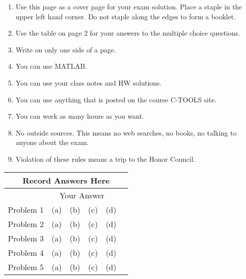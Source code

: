 \documentclass[letterpaper]{article}
\begin{document}
\vspace*{.45in} 
\begin{enumerate}
\item Use this page as a cover page for your exam solution. Place a staple in the upper left hand corner. Do not staple along the edges to form a booklet.
    \item Use the table on page 2 for your answers to the multiple choice questions.
    \item Write on only one side of a page.
\item You can use MATLAB.
\item You can use your class notes and HW solutions.
 \item You can use anything that is posted on the course C-TOOLS site.
 \item You can work as many hours as you want.
 \item No outside sources. This means no web searches, no books, no talking to anyone about the exam.
 \item Violation of these rules means a trip to the Honor Council.
\end{enumerate}
\vspace*{.4in}



\newpage

\vspace*{1in}

\begin{center}
\Large
\begin{tabular}{|p{1.2in}|p{1.5in}|}
\hline
\multicolumn{2}{|c|}{\textbf{Record Answers Here}}\\
\hline
 & ~~Your Answer\\
\hline
Problem 1 &   (a)~~(b)~~(c)~~(d)~~\\
\hline
Problem 2 &   (a)~~(b)~~(c)~~(d)~~\\
\hline
Problem 3 &   (a)~~(b)~~(c)~~(d)~~\\
\hline
Problem 4 &   (a)~~(b)~~(c)~~(d)~~\\
\hline
Problem 5 &   (a)~~(b)~~(c)~~(d)~~\\
\hline
\end{tabular}
\end{center}

\vspace*{1in}
\end{document}
